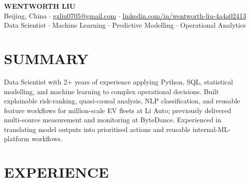 \documentclass[a4paper,9pt]{article}
\begin{document}
\begin{center}
    {\Large\bfseries WENTWORTH LIU}\\[2pt]
    {\small Beijing, China \;$\cdot$\; \href{mailto:gzliu0705@gmail.com}{gzliu0705@gmail.com} \;$\cdot$\; \href{https://www.linkedin.com/in/wentworth-liu-4a4a02413/}{linkedin.com/in/wentworth-liu-4a4a02413}}\\[2pt]
    {\small Data Scientist \;$\cdot$\; Machine Learning \;$\cdot$\; Predictive Modelling \;$\cdot$\; Operational Analytics}
\end{center}

\vspace{-3pt}

\section{SUMMARY}
Data Scientist with 2+ years of experience applying Python, SQL, statistical modelling, and machine learning to complex operational decisions. Built explainable risk-ranking, quasi-causal analysis, NLP classification, and reusable feature workflows for million-scale EV fleets at Li Auto; previously delivered multi-source measurement and monitoring at ByteDance. Experienced in translating model outputs into prioritised actions and reusable internal-ML-platform workflows.

\section{EXPERIENCE}
\end{document}
